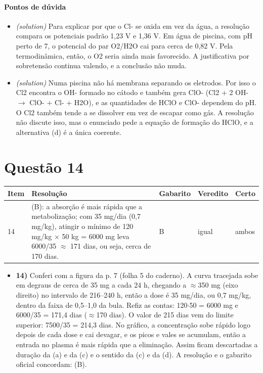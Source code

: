 \documentclass{article}%
\begin{document}
\paragraph{Pontos de dúvida}%
\begin{itemize}%
\item%
\textit{(solution)} Para explicar por que o Cl{-} se oxida em vez da água, a resolução compara os potenciais padrão 1,23 V e 1,36 V. Em água de piscina, com pH perto de 7, o potencial do par O2/H2O cai para cerca de 0,82 V. Pela termodinâmica, então, o O2 seria ainda mais favorecido. A justificativa por sobretensão continua valendo, e a conclusão não muda.%
\item%
\textit{(solution)} Numa piscina não há membrana separando os eletrodos. Por isso o Cl2 encontra o OH{-} formado no cátodo e também gera ClO{-} (Cl2 + 2 OH{-} $\to$ ClO{-} + Cl{-} + H2O), e as quantidades de HClO e ClO{-} dependem do pH. O Cl2 também tende a se dissolver em vez de escapar como gás. A resolução não discute isso, mas o enunciado pede a equação de formação do HClO, e a alternativa (d) é a única coerente.%
\end{itemize}%
\section*{Questão 14}%
\begin{longtable}{@{}p{} p{} p{} p{} p{}@{}}\toprule Item & Resolução & Gabarito & Veredito & Certo \\ \midrule
14 & (B): a absorção é mais rápida que a metabolização; com 35 mg/dia (0,7 mg/kg), atingir o mínimo de 120 mg/kg $\times$ 50 kg = 6000 mg leva 6000/35 $\approx$ 171 dias, ou seja, cerca de 170 dias. & B & igual & ambos \\
\bottomrule\end{longtable}%
\begin{itemize}%
\item%
\textbf{14)} Conferi com a figura da p. 7 (folha 5 do caderno). A curva tracejada sobe em degraus de cerca de 35 mg a cada 24 h, chegando a $\approx$350 mg (eixo direito) no intervalo de 216--240 h, então a dose é 35 mg/dia, ou 0,7 mg/kg, dentro da faixa de 0,5--1,0 da bula. Refiz as contas: 120$\cdot$50 = 6000 mg e 6000/35 = 171,4 dias ($\approx$170 dias). O valor de 215 dias vem do limite superior: 7500/35 = 214,3 dias. No gráfico, a concentração sobe rápido logo depois de cada dose e cai devagar, e os picos e vales se acumulam, então a entrada no plasma é mais rápida que a eliminação. Assim ficam descartadas a duração da (a) e da (c) e o sentido da (c) e da (d). A resolução e o gabarito oficial concordam: (B).%
\end{itemize}%
\end{document}
